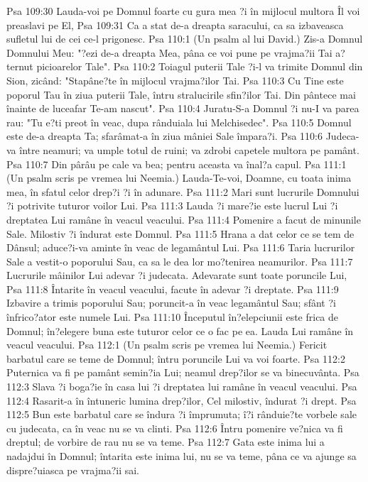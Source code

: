 Psa 109:30  Lauda-voi pe Domnul foarte cu gura mea ?i în mijlocul multora Îl voi preaslavi pe El,
Psa 109:31  Ca a stat de-a dreapta saracului, ca sa izbaveasca sufletul lui de cei ce-l prigonesc.
Psa 110:1  (Un psalm al lui David.) Zis-a Domnul Domnului Meu: "?ezi de-a dreapta Mea, pâna ce voi pune pe vrajma?ii Tai a?ternut picioarelor Tale".
Psa 110:2  Toiagul puterii Tale ?i-l va trimite Domnul din Sion, zicând: "Stapâne?te în mijlocul vrajma?ilor Tai.
Psa 110:3  Cu Tine este poporul Tau în ziua puterii Tale, întru stralucirile sfin?ilor Tai. Din pântece mai înainte de luceafar Te-am nascut".
Psa 110:4  Juratu-S-a Domnul ?i nu-I va parea rau: "Tu e?ti preot în veac, dupa rânduiala lui Melchisedec".
Psa 110:5  Domnul este de-a dreapta Ta; sfarâmat-a în ziua mâniei Sale împara?i.
Psa 110:6  Judeca-va între neamuri; va umple totul de ruini; va zdrobi capetele multora pe pamânt.
Psa 110:7  Din pârâu pe cale va bea; pentru aceasta va înal?a capul.
Psa 111:1  (Un psalm scris pe vremea lui Neemia.) Lauda-Te-voi, Doamne, cu toata inima mea, în sfatul celor drep?i ?i în adunare.
Psa 111:2  Mari sunt lucrurile Domnului ?i potrivite tuturor voilor Lui.
Psa 111:3  Lauda ?i mare?ie este lucrul Lui ?i dreptatea Lui ramâne în veacul veacului.
Psa 111:4  Pomenire a facut de minunile Sale. Milostiv ?i îndurat este Domnul.
Psa 111:5  Hrana a dat celor ce se tem de Dânsul; aduce?i-va aminte în veac de legamântul Lui.
Psa 111:6  Taria lucrurilor Sale a vestit-o poporului Sau, ca sa le dea lor mo?tenirea neamurilor.
Psa 111:7  Lucrurile mâinilor Lui adevar ?i judecata. Adevarate sunt toate poruncile Lui,
Psa 111:8  Întarite în veacul veacului, facute în adevar ?i dreptate.
Psa 111:9  Izbavire a trimis poporului Sau; poruncit-a în veac legamântul Sau; sfânt ?i înfrico?ator este numele Lui.
Psa 111:10  Începutul în?elepciunii este frica de Domnul; în?elegere buna este tuturor celor ce o fac pe ea. Lauda Lui ramâne în veacul veacului.
Psa 112:1  (Un psalm scris pe vremea lui Neemia.) Fericit barbatul care se teme de Domnul; întru poruncile Lui va voi foarte.
Psa 112:2  Puternica va fi pe pamânt semin?ia Lui; neamul drep?ilor se va binecuvânta.
Psa 112:3  Slava ?i boga?ie în casa lui ?i dreptatea lui ramâne în veacul veacului.
Psa 112:4  Rasarit-a în întuneric lumina drep?ilor, Cel milostiv, îndurat ?i drept.
Psa 112:5  Bun este barbatul care se îndura ?i împrumuta; î?i rânduie?te vorbele sale cu judecata, ca în veac nu se va clinti.
Psa 112:6  Întru pomenire ve?nica va fi dreptul; de vorbire de rau nu se va teme.
Psa 112:7  Gata este inima lui a nadajdui în Domnul; întarita este inima lui, nu se va teme, pâna ce va ajunge sa dispre?uiasca pe vrajma?ii sai.
